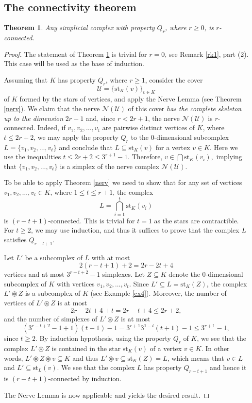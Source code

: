 \documentclass[11pt,twoside, reqno]{amsart}
\theoremstyle{plain}
\newtheorem{teo}[lema]{Theorem}
\theoremstyle{definition}
\newcommand{\st}{\textrm{st}}
\DeclareMathOperator{\join}{\circledast}
\begin{document}
\subsection{The connectivity theorem} 
\begin{teo} \label{thm:6} Any simplicial complex with property $Q_r$, where $r\ge 0$, is $r$-connected.
\end{teo}
\begin{proof}
The statement of Theorem \ref{thm:6} is trivial for $r=0$, see Remark \ref{rk1}, part (2). 
This case will be used as the base of induction. 

Assuming that $K$ has property $Q_r$, where $r\ge 1$, consider the cover 
$$
\mathcal{U}=\{\st_K(v)\}_{v\in K}$$
of $K$ formed by the stars of vertices, and apply the Nerve Lemma (see Theorem \ref{nerv}). 
We claim that the nerve $\mathcal N(\mathcal{U})$ of this cover {\it has the complete skeleton up to the dimension} $2r+1$ and, 
since $r<2r+1$, 
the nerve $\mathcal N(\mathcal{U})$ is $r$-connected.
Indeed, if $v_1, v_2, \ldots, v_t$ are pairwise distinct vertices of $K$, where $t\le 2r+2$, we may apply the property $Q_r$ to the 0-dimensional subcomplex 
$L=\{v_1, v_2, \ldots, v_t\}$ and conclude that $L\subseteq \st_K(v)$ for a vertex $v\in K$. Here we use the inequalities
$t\le 2r+2\le 3^{r+1}-1.$
Therefore, $v\in  \bigcap \st_K(v_i),$ implying that $\{v_1, v_2, \dots, v_t\}$
is a simplex of the nerve complex 
$\mathcal N(\mathcal{U})$.
    

To be able to apply Theorem \ref{nerv} we need to show that for any set of vertices $v_1,v_2,\ldots, v_t \in K$, where 
$1\le t\le r+1$, the complex 
$$L=\bigcap_{i=1}^t \st_K(v_i)$$
is $(r-t+1)$-connected. This is trivial  for $t=1$ as the stars are contractible. 
For $t\ge 2$, we may use induction, and thus it suffices to prove that the complex $L$ satisfies $Q_{r-t+1}$. 

Let $L'$ be a subcomplex of $L$ with at most $$2(r-t+1)+2=2r-2t+4$$ vertices and at most $3^{r-t+2}-1$ simplexes. Let $Z\subseteq K$ denote the 0-dimensional subcomplex of $K$ with vertices $v_1,v_2,\ldots, v_t$. Since $L'\subseteq L=\st_K(Z)$, the complex $L'\join Z$ is a subcomplex of $K$ (see Example \ref{ex4}). Moreover, the number of vertices of $L'\join Z$ is at most $$2r-2t+4+t=2r-t+4\le 2r+2,$$ and the number of simplexes of $L'\join Z$
is at most $$(3^{r-t+2}-1+1)(t+1)-1=3^{r+1}3^{1-t}(t+1)-1\le 3^{r+1}-1,$$ since $t\ge 2$. By induction hypothesis, using the property $Q_r$ of $K$, we see that the complex $L'\join Z$ is contained in the star $\st_K(v)$ of a vertex $v\in K$. In other words, $L'\join Z\join v \subseteq K$ and thus 
$L'\join v \subseteq \st_K(Z)=L$, which means that $v\in L$ and $L' \subseteq \st_L(v)$. We see that the complex $L$ has property $Q_{r-t+1}$ and hence it is $(r-t+1)$-connected by induction. 

The Nerve Lemma is now applicable and yields the desired result. 
\end{proof}
\end{document}
